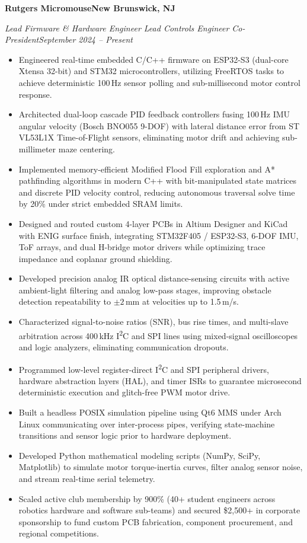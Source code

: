 \documentclass[10pt]{article}
\newcommand{\Company}[2]{\noindent\textbf{#1}\hfill\textbf{#2}\par}
\newcommand{\RoleDates}[2]{\noindent\textit{#1}\hfill\textit{#2}\par}
\begin{document}
\Company{Rutgers Micromouse}{New Brunswick, NJ}
\RoleDates{Lead Firmware \& Hardware Engineer \textbar{} Lead Controls Engineer \textbar{} Co-President}{September 2024 -- Present}
\begin{itemize}
  \item Engineered real-time embedded C/C++ firmware on ESP32-S3 (dual-core Xtensa 32-bit) and STM32 microcontrollers, utilizing FreeRTOS tasks to achieve deterministic 100\,Hz sensor polling and sub-millisecond motor control response.
  \item Architected dual-loop cascade PID feedback controllers fusing 100\,Hz IMU angular velocity (Bosch BNO055 9-DOF) with lateral distance error from ST VL53L1X Time-of-Flight sensors, eliminating motor drift and achieving sub-millimeter maze centering.
  \item Implemented memory-efficient Modified Flood Fill exploration and A* pathfinding algorithms in modern C++ with bit-manipulated state matrices and discrete PID velocity control, reducing autonomous traversal solve time by 20\% under strict embedded SRAM limits.
  \item Designed and routed custom 4-layer PCBs in Altium Designer and KiCad with ENIG surface finish, integrating STM32F405 / ESP32-S3, 6-DOF IMU, ToF arrays, and dual H-bridge motor drivers while optimizing trace impedance and coplanar ground shielding.
  \item Developed precision analog IR optical distance-sensing circuits with active ambient-light filtering and analog low-pass stages, improving obstacle detection repeatability to $\pm2$\,mm at velocities up to 1.5\,m/s.
  \item Characterized signal-to-noise ratios (SNR), bus rise times, and multi-slave arbitration across 400\,kHz I\textsuperscript{2}C and SPI lines using mixed-signal oscilloscopes and logic analyzers, eliminating communication dropouts.
  \item Programmed low-level register-direct I\textsuperscript{2}C and SPI peripheral drivers, hardware abstraction layers (HAL), and timer ISRs to guarantee microsecond deterministic execution and glitch-free PWM motor drive.
  \item Built a headless POSIX simulation pipeline using Qt6 MMS under Arch Linux communicating over inter-process pipes, verifying state-machine transitions and sensor logic prior to hardware deployment.
  \item Developed Python mathematical modeling scripts (NumPy, SciPy, Matplotlib) to simulate motor torque-inertia curves, filter analog sensor noise, and stream real-time serial telemetry.
  \item Scaled active club membership by 900\% (40+ student engineers across robotics hardware and software sub-teams) and secured \$2,500+ in corporate sponsorship to fund custom PCB fabrication, component procurement, and regional competitions.
\end{itemize}
\end{document}
